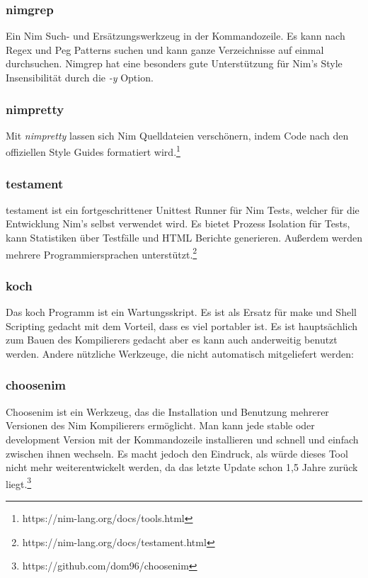\documentclass[11pt]{report}
\begin{document}
\subsubsection{nimgrep}
Ein Nim Such- und Ersätzungswerkzeug in der Kommandozeile. Es kann nach Regex und Peg Patterns suchen und kann ganze Verzeichnisse auf einmal durchsuchen. Nimgrep hat eine besonders gute Unterstützung für Nim's Style Insensibilität durch die \emph{-y} Option.

\subsubsection{nimpretty}
Mit \emph{nimpretty} lassen sich Nim Quelldateien verschönern, indem Code nach den offiziellen Style Guides formatiert wird.\footnote{https://nim-lang.org/docs/tools.html}

\subsubsection{testament}
testament ist ein fortgeschrittener Unittest Runner für Nim Tests, welcher für die Entwicklung Nim's selbst verwendet wird. Es bietet Prozess Isolation für Tests, kann Statistiken über Testfälle und HTML Berichte generieren. Außerdem werden mehrere Programmiersprachen unterstützt.\footnote{https://nim-lang.org/docs/testament.html}

\subsubsection{koch}
Das koch Programm ist ein Wartungsskript. Es ist als Ersatz für make und Shell Scripting gedacht mit dem Vorteil, dass es viel portabler ist. Es ist hauptsächlich zum Bauen des Kompilierers gedacht aber es kann auch anderweitig benutzt werden.
\newline\newline\newline
Andere nützliche Werkzeuge, die nicht automatisch mitgeliefert werden:

\subsubsection{choosenim}
Choosenim ist ein Werkzeug, das die Installation und Benutzung mehrerer Versionen des Nim Kompilierers ermöglicht. Man kann jede stable oder development Version mit der Kommandozeile installieren und schnell und einfach zwischen ihnen wechseln.
Es macht jedoch den Eindruck, als würde dieses Tool nicht mehr weiterentwickelt werden, da das letzte Update schon 1,5 Jahre zurück liegt.\footnote{https://github.com/dom96/choosenim}
\end{document}

